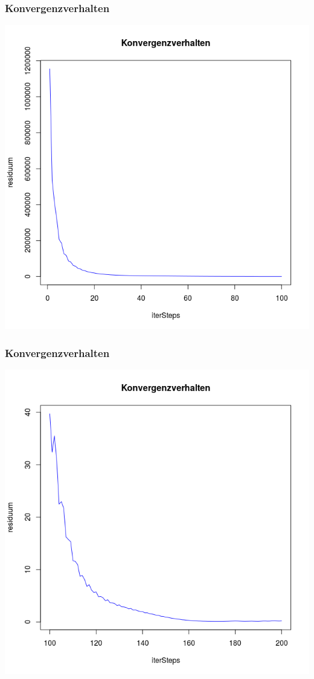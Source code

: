 \documentclass[]{beamer}
\begin{document}
\begin{frame}
\frametitle{Konvergenzverhalten}
\begin{center}
\includegraphics[scale=0.33]{Konvergenzverhalten_1_100.png}
\end{center}
\end{frame}

\begin{frame}
\frametitle{Konvergenzverhalten}
\begin{center}
\includegraphics[scale=0.33]{Konvergenzverhalten_100_200.png}
\end{center}
\end{frame}
\end{document}
